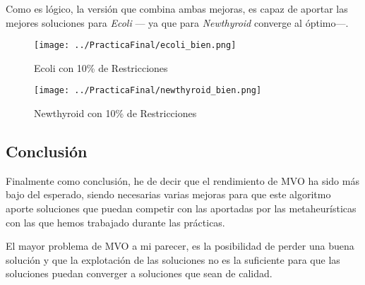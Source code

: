 Como es lógico, la versión que combina ambas mejoras, es capaz de aportar las mejores soluciones para \emph{Ecoli} --- ya que para \emph{Newthyroid} converge al óptimo---.


\begin{figure}[H]
   \centering
   \texttt{[image: ../PracticaFinal/ecoli\_bien.png]}
   \caption{Ecoli con 10\% de Restricciones}
\end{figure}

\begin{figure}[H]
   \centering
   \texttt{[image: ../PracticaFinal/newthyroid\_bien.png]}
   \caption{Newthyroid con 10\% de Restricciones}
\end{figure}

\subsection{Conclusión}

Finalmente como conclusión, he de decir que el rendimiento de MVO ha sido más bajo del esperado, siendo necesarias varias mejoras para que este algoritmo aporte soluciones que puedan competir con las aportadas por las metaheurísticas con las que hemos trabajado durante las prácticas.

El mayor problema de MVO a mi parecer, es la posibilidad de perder una buena solución y que la explotación de las soluciones no es la suficiente para que las soluciones puedan converger a soluciones que sean de calidad.
